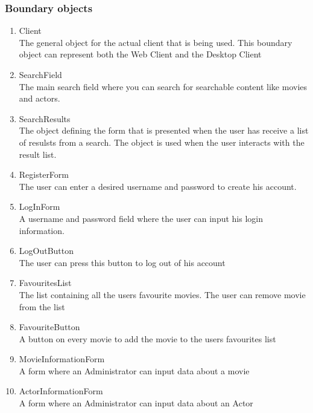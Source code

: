 \subsubsection{Boundary objects}

\begin{enumerate}

	\item Client \hfill \\
	The general object for the actual client that is being used. This boundary object can represent both the Web Client and the Desktop Client

	\item SearchField \hfill \\
	The main search field where you can search for searchable content like movies and actors.
	
	\item SearchResults \hfill \\
	The object defining the form that is presented when the user has receive a list of resulsts from a search. The object is used when the user interacts with the result list.
	
	\item RegisterForm \hfill \\
	The user can enter a desired username and password to create his account.

	\item LogInForm \hfill \\
	A username and password field where the user can input his login information.
	
	\item LogOutButton \hfill \\
	The user can press this button to log out of his account
	
	\item FavouritesList \hfill \\
	The list containing all the users favourite movies. The user can remove movie from the list
	
	\item FavouriteButton \hfill \\
	A button on every movie to add the movie to the users favourites list
	
	\item MovieInformationForm \hfill \\
	A form where an Administrator can input data about a movie
	
	\item ActorInformationForm \hfill \\
	A form where an Administrator can input data about an Actor
	
	
\end{enumerate}

